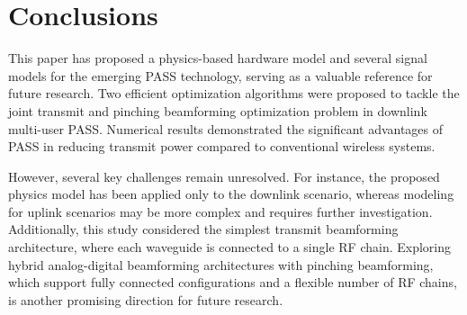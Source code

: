 \section{Conclusions} \label{sec:conclusion}

This paper has proposed a physics-based hardware model and several signal models for the emerging PASS technology, serving as a valuable reference for future research. Two efficient optimization algorithms were proposed to tackle the joint transmit and pinching beamforming optimization problem in downlink multi-user PASS. Numerical results demonstrated the significant advantages of PASS in reducing transmit power compared to conventional wireless systems.

However, several key challenges remain unresolved. For instance, the proposed physics model has been applied only to the downlink scenario, whereas modeling for uplink scenarios may be more complex and requires further investigation. Additionally, this study considered the simplest transmit beamforming architecture, where each waveguide is connected to a single RF chain. Exploring hybrid analog-digital beamforming architectures with pinching beamforming, which support fully connected configurations and a flexible number of RF chains, is another promising direction for future research.

